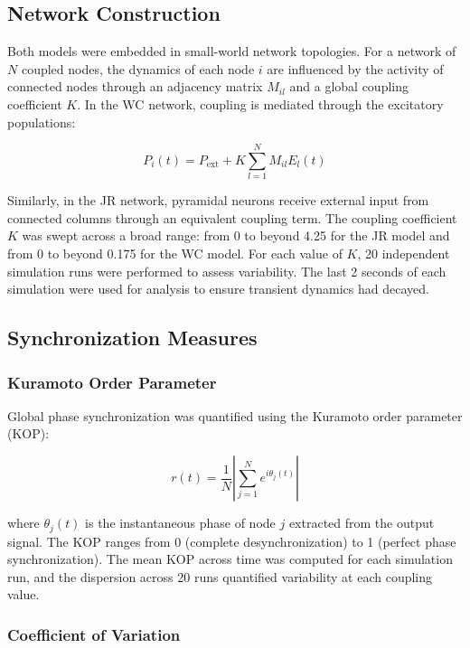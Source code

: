 \documentclass[12pt]{article}
\begin{document}
\subsection{Network Construction}

Both models were embedded in small-world network topologies. For a network of $N$ coupled nodes, the dynamics of each node $i$ are influenced by the activity of connected nodes through an adjacency matrix $M_{il}$ and a global coupling coefficient $K$. In the WC network, coupling is mediated through the excitatory populations:

\begin{equation}
P_i(t) = P_{\text{ext}} + K \sum_{l=1}^{N} M_{il} E_l(t)
\end{equation}

\noindent Similarly, in the JR network, pyramidal neurons receive external input from connected columns through an equivalent coupling term. The coupling coefficient $K$ was swept across a broad range: from 0 to beyond 4.25 for the JR model and from 0 to beyond 0.175 for the WC model. For each value of $K$, 20 independent simulation runs were performed to assess variability. The last 2 seconds of each simulation were used for analysis to ensure transient dynamics had decayed.

\subsection{Synchronization Measures}

\subsubsection{Kuramoto Order Parameter}

Global phase synchronization was quantified using the Kuramoto order parameter (KOP):

\begin{equation}
r(t) = \frac{1}{N} \left| \sum_{j=1}^{N} e^{i\theta_j(t)} \right|
\end{equation}

\noindent where $\theta_j(t)$ is the instantaneous phase of node $j$ extracted from the output signal. The KOP ranges from 0 (complete desynchronization) to 1 (perfect phase synchronization). The mean KOP across time was computed for each simulation run, and the dispersion across 20 runs quantified variability at each coupling value.

\subsubsection{Coefficient of Variation}
\end{document}
